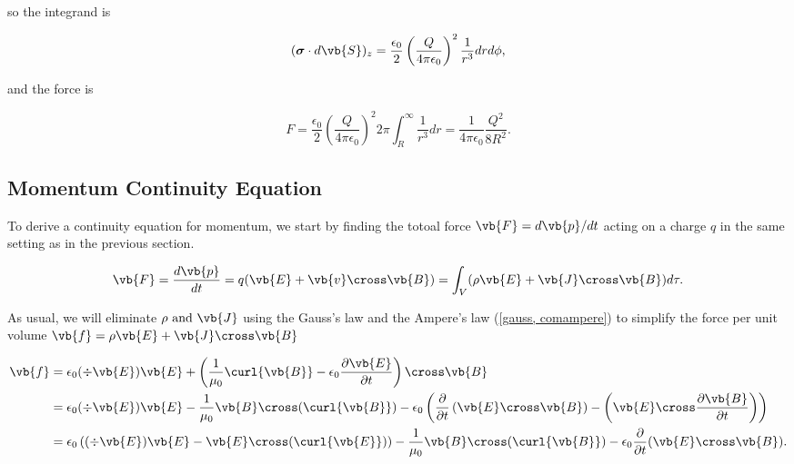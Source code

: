 \documentclass[english,a4paper,12pt]{report}
\begin{document}
{so the integrand is 

\begin{equation}
    (\boldsymbol{\sigma }\cdot d\vb{S}  )_{z} = \frac{\epsilon_0 }{2} \left( \frac{Q}{4\pi \epsilon_0 }  \right)^2 \frac{1}{r^3 }dr d\phi ,   
\end{equation}

and the force is 

\begin{equation}
    F = \frac{\epsilon_0 }{2} \left( \frac{Q}{4\pi \epsilon_0 }  \right)^2 2\pi \int_{R}^{\infty} \frac{1}{r^3 }dr = \frac{1}{4\pi \epsilon_0} \frac{Q^2}{8R^2}.     
\end{equation}
}


\subsection{Momentum Continuity Equation}

To derive a continuity equation for momentum, we start by finding the totoal force \(\vb{F} = d\vb{p} /dt\) acting on a charge \(q\) in the same setting as in the previous section. 

\begin{equation}
    \vb{F} = \frac{d\vb{p} }{dt}  = q(\vb{E} + \vb{v} \cross \vb{B} ) = \int_{V}^{} (\rho \vb{E} + \vb{J} \cross \vb{B}) d\tau . 
\end{equation}

As usual, we will eliminate \(\rho \text { and } \vb{J} \) using the Gauss's law and the Ampere's law (\cref{gauss, comampere}) to simplify the force per unit volume \(\vb{f} = \rho \vb{E} + \vb{J} \cross \vb{B} \) 

\begin{equation}
    \begin{aligned}
        \vb{f}  &= \epsilon_0 (\div{\vb{E} } )\vb{E}  + \left( \frac{1}{\mu_0} \curl{\vb{B} } - \epsilon_0 \frac{\partial \vb{E} }{\partial t}    \right) \cross \vb{B} \\
        &= \epsilon_0 (\div{\vb{E} } )\vb{E}  - \frac{1}{\mu_0 }\vb{B} \cross (\curl{\vb{B} } ) - \epsilon_0 \left( \frac{\partial }{\partial t} \left( \vb{E} \cross \vb{B}  \right) - \left( \vb{E} \cross \frac{\partial \vb{B} }{\partial t}  \right) \right) \\
        &= \epsilon_0 \left( (\div{\vb{E} } )\vb{E}  - \vb{E} \cross (\curl{\vb{E} } ) \right) - \frac{1}{\mu_0} \vb{B} \cross (\curl{\vb{B} } ) - \epsilon_0 \frac{\partial }{\partial t} (\vb{E} \cross \vb{B} ).
    \end{aligned}
\end{equation}
\end{document}
